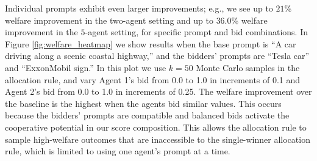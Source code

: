 \documentclass[format=acmsmall, review=false]{acmart}
\begin{document}
Individual prompts exhibit even larger improvements; e.g., we see up to $21$\% welfare improvement in the two-agent setting and up to $36.0$\% welfare improvement in the $5$-agent setting, for specific prompt and bid combinations. In Figure \ref{fig:welfare_heatmap} we show results when the base prompt is ``A car driving along a scenic coastal highway,'' and the bidders' prompts are ``Tesla car'' and ``ExxonMobil sign.'' %
In this plot we use $k=50$ Monte Carlo samples in the allocation rule, and vary Agent 1's bid from 0.0 to 1.0 in increments of 0.1 and Agent 2's bid from 0.0 to 1.0 in increments of 0.25. The welfare improvement over the baseline is the highest when the agents bid similar values. This occurs because the bidders' prompts are compatible and balanced bids activate the cooperative potential in our score composition. This allows the allocation rule to sample high-welfare outcomes that are  inaccessible to the single-winner allocation rule, which is limited to using one agent's prompt at a time.




\end{document}
